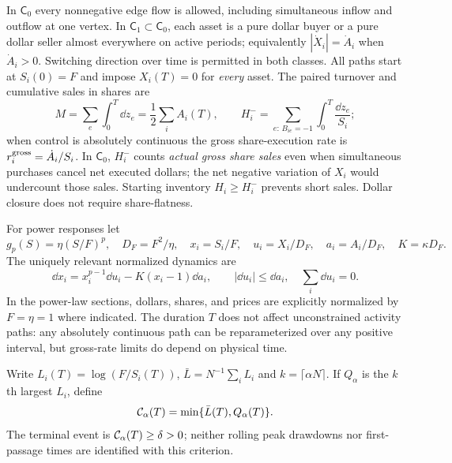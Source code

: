 \documentclass[review,hidelinks,onefignum,onetabnum]{siamonline250211}%
\begin{document}
\begin{definition}\label{def:controls}
In $\mathsf C_0$ every nonnegative edge flow is allowed, including simultaneous
inflow and outflow at one vertex. In $\mathsf C_1\subset\mathsf C_0$, each
asset is a pure dollar buyer or a pure dollar seller almost everywhere on
active periods; equivalently $|\dot X_i|=\dot A_i$ when $\dot A_i>0$.
Switching direction over time is permitted in both classes.
All paths start at $S_i(0)=F$ and impose $X_i(T)=0$ for \emph{every} asset.
The paired turnover and cumulative sales in shares are
\begin{equation}\label{eq:resource}
 M=\sum_e\int_0^T\dd z_e=\frac12\sum_i A_i(T),\qquad
 H_i^-=\sum_{e:\,B_{ie}=-1}\int_0^T\frac{\dd z_e}{S_i};
\end{equation}
when control is absolutely continuous the gross share-execution rate is
$r_i^{\rm gross}=\dot A_i/S_i$. In $\mathsf C_0$, $H_i^-$ counts
\emph{actual gross share sales} even when simultaneous purchases cancel
net executed dollars; the net negative variation of $X_i$ would undercount
those sales. Starting inventory $H_i\ge H_i^-$ prevents short sales.
Dollar closure does not require share-flatness.
\end{definition}

For power responses let
\begin{equation}\label{eq:power}
 g_p(S)=\eta(S/F)^p,\quad D_F=F^2/\eta,\quad
 x_i=S_i/F,\quad u_i=X_i/D_F,\quad a_i=A_i/D_F,\quad K=\kappa D_F.
\end{equation}
The uniquely relevant normalized dynamics are
\begin{equation}\label{eq:normalized}
 \boxed{\dd x_i=x_i^{p-1}\dd u_i-K(x_i-1)\dd a_i},\qquad
 |\dd u_i|\le\dd a_i,\quad\sum_i\dd u_i=0.
\end{equation}
In the power-law sections, dollars, shares, and prices are explicitly
normalized by $F=\eta=1$ where indicated. The duration $T$ does not affect
unconstrained activity paths: any absolutely continuous path can be
reparameterized over any positive interval, but gross-rate limits do depend
on physical time.

\begin{definition}\label{def:crisis}
Write $L_i(T)=\log(F/S_i(T))$, $\bar L=N^{-1}\sum_iL_i$ and
$k=\lceil\alpha N\rceil$. If $Q_\alpha$ is the $k$th largest $L_i$, define
\begin{equation}\label{eq:crisis}
 \mathcal{C}_\alpha(T)=\min\{\bar L(T),Q_\alpha(T)\}.
\end{equation}
The terminal event is $\mathcal{C}_\alpha(T)\ge\delta>0$; neither rolling
peak drawdowns nor first-passage times are identified with this criterion.
\end{definition}
\end{document}
